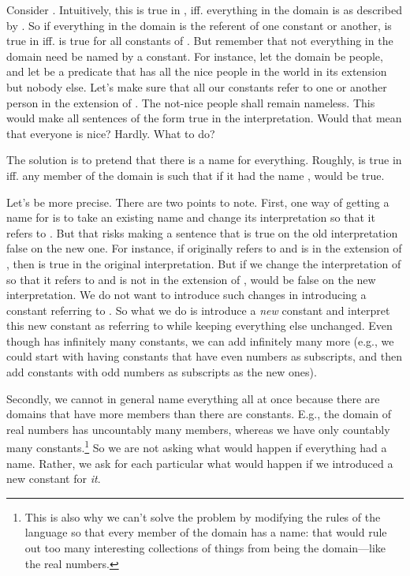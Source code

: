 Consider \p{\lforall \upsilon \phi(\upsilon)}. Intuitively, this is true in 
\model, iff. everything in the domain is as described by \p{\phi}. So if 
everything in the domain is the referent of one constant or another, \p{\lforall 
\upsilon \phi(\upsilon)} is true in \model{} iff. \p{\phi(\kappa)} is true for 
all constants of \lL[Q]. But remember that not everything in the domain need be 
named by a constant. For instance, let the domain be people, and let  be a 
predicate that has all the nice people in the world in its extension but nobody 
else.  Let's make sure that all our constants refer to one or another person in 
the extension of .  The not-nice people shall remain nameless. This  would 
make all sentences  of the form  true in the interpretation. Would 
that mean that everyone is nice? Hardly. What to do?

The solution is to pretend that there is a name for everything. Roughly,  
\p{\lforall \upsilon \phi(\upsilon)} is true in \model{} iff. any member 
 of the domain is such that if it had the name \p{\kappa}, 
\p{\phi(\kappa)} would be true.

Let's be more precise. There are two points to note. First, one way of getting a 
name for  is to take an existing name  and change its 
interpretation so that it refers to . But that risks making a 
sentence that is true on the old interpretation false on the new one. For 
instance, if  originally refers to  and  is 
in the extension of , then  is true in the original interpretation.  
But if we change the interpretation of  so that it refers to  
and  is not in the extension of ,  would be false on 
the new interpretation. We do not want to introduce such changes in introducing 
a constant referring to .  So what we do is introduce a \emph{new} 
constant \p{\kappa} and interpret this new constant as referring to  while keeping everything else unchanged. Even though \lL[Q]{} has infinitely 
many constants, we can add infinitely many more (e.g., we could start with 
having constants that have even numbers as subscripts, and then add constants 
with odd numbers as subscripts as the new ones).

Secondly, we cannot in general name everything all at once because there are 
domains that have more members than there are constants. E.g., the domain of 
real numbers has uncountably many members, whereas we have only countably many 
constants.\footnote{This is also why we can't solve the problem by modifying the 
 rules of the language so that every member of the domain has a name: that would 
rule out too many interesting collections of things from being the domain---like 
the real numbers.} So we are not asking what would happen if everything had a 
name.  Rather, we ask for each particular  what would happen if 
we introduced a new constant for \emph{it}.

